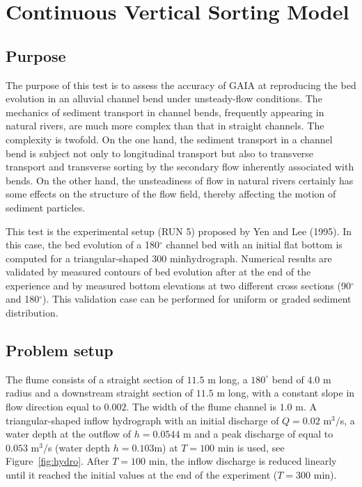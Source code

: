 \chapter{Continuous Vertical Sorting Model}
%

%
\section{Purpose}
%
The purpose of this test is to assess the accuracy of \textsc{GAIA} at
reproducing the bed evolution in an alluvial channel bend under unsteady-flow
conditions. The mechanics of sediment transport in channel bends, frequently
appearing in natural rivers, are much more complex than that in straight
channels. The complexity is twofold. On the one hand, the sediment transport in
a channel bend is subject not only to longitudinal transport but also to
transverse transport and transverse sorting by the secondary flow inherently
associated with bends. On the other hand, the unsteadiness of flow in natural
rivers certainly has some effects on the structure of the flow field, thereby
affecting the motion of sediment particles.

This test is the experimental setup (RUN 5) proposed by Yen and Lee (1995). In
this case, the bed evolution of a 180$^{\circ}$ channel bed with an initial
flat bottom is computed for a triangular-shaped $300$ min\. hydrograph.
Numerical results are validated by measured contours of bed evolution after at
the end of the experience and by measured bottom elevations at two different
cross sections (90$^{\circ}$ and 180$^{\circ}$). This validation case can be
performed for uniform or graded sediment distribution.
%
\section{Problem setup}
%
The flume consists of a straight section of $11.5$ m long, a $180^{\circ}$ bend
of $4.0$ m radius and a downstream straight section of $11.5$ m long, with a
constant slope in flow direction equal to $0.002$. The width of the flume
channel is $1.0$ m. A triangular-shaped inflow hydrograph with an initial
discharge of $Q=0.02$ m$^3/$s, a water depth at the outflow of $h = 0.0544$ m
and a peak discharge of equal to $0.053$ m$^3/$s (water depth $h=0.103$m) at $T
= 100$ min is used, see Figure~\ref{fig:hydro}. After $T = 100$ min, the inflow
discharge is reduced linearly until it reached the initial values at the end of
the experiment ($T = 300$ min).

